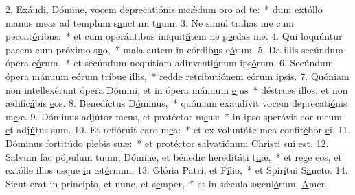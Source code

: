 2. Exáudi, Dómine, vocem deprecatiónis meǽdum oro \uline{a}d te:~* dum extóllo manus meas ad templum s\uline{a}nctum t\uline{u}um.
3. Ne simul trahas me cum peccat\uline{ó}ribus:~* et cum operántibus iniquit\uline{á}tem ne p\uline{e}rdas me.
4. Qui loquúntur pacem cum próximo s\uline{u}o,~* mala autem in córdib\uline{u}s e\uline{ó}rum.
5. Da illis secúndum ópera e\uline{ó}rum,~* et secúndum nequítiam adinventi\uline{ó}num ips\uline{ó}rum.
6. Secúndum ópera mánuum eórum tríbue \uline{i}llis,~* redde retributiónem e\uline{ó}rum \uline{i}psis.
7. Quóniam non intellexérunt ópera Dómini, et in ópera mánuum \uline{e}jus~* déstrues illos, et non ædific\uline{á}bis \uline{e}os.
8. Benedíctus D\uline{ó}minus,~* quóniam exaudívit vocem deprecati\uline{ó}nis m\uline{e}æ.
9. Dóminus adjútor meus, et protéctor m\uline{e}us:~* in ipso sperávit cor meum \uline{e}t adj\uline{ú}tus sum.
10. Et reflóruit caro m\uline{e}a:~* et ex voluntáte mea confit\uline{é}bor \uline{e}i.
11. Dóminus fortitúdo plebis s\uline{u}æ:~* et protéctor salvatiónum Chr\uline{i}sti s\uline{u}i est.
12. Salvum fac pópulum tuum, Dómine, et bénedic hereditáti t\uline{u}æ,~* et rege eos, et extólle illos usque \uline{i}n æt\uline{é}rnum.
13. Glória Patri, et F\uline{í}lio,~* et Spir\uline{í}tui S\uline{a}ncto.
14. Sicut erat in princípio, et nunc, et s\uline{e}mper,~* et in sǽcula sæcul\uline{ó}rum. \uline{A}men.
